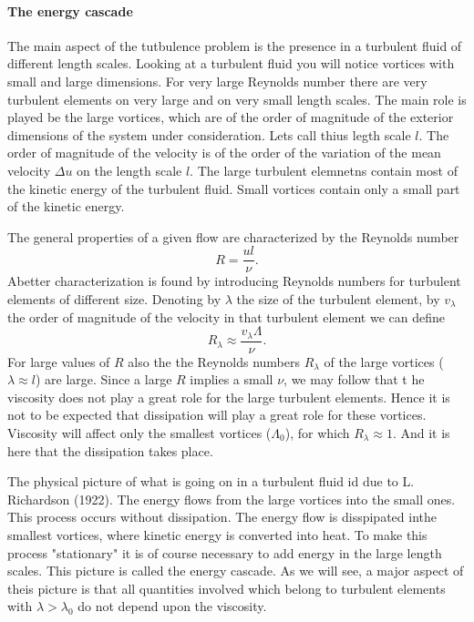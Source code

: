 \paragraph{The energy cascade}
The main aspect of the tutbulence problem is the presence in a turbulent fluid
of different length scales. Looking at a turbulent fluid you will notice
vortices with small and large dimensions. For very large Reynolds number there
are very turbulent elements on very large and on very small length scales. The
main role is played be the large vortices, which are of the order of magnitude
of the exterior dimensions of the system under consideration. Lets call thius
legth scale $l$. The order of magnitude of the velocity is of the order of the
variation of the mean velocity $\Delta u$  on the length scale $l$. The large
turbulent elemnetns contain most of the kinetic energy of the turbulent
fluid. Small vortices contain only a small part of the kinetic energy.

The general properties of a given flow are characterized by the Reynolds
number
\begin{displaymath}
  R = \frac{ul}{\nu}.
\end{displaymath}
Abetter characterization is found by introducing Reynolds numbers  for
turbulent elements of different size. Denoting by $\lambda$ the size of the
turbulent element, by $v_{\lambda}$ the order of magnitude of the velocity in
that turbulent element we can define
\begin{displaymath}
  R_{\lambda} \approx \frac{v_{\lambda} \Lambda}{\nu}.
\end{displaymath}
For large values of $R$ also the  the Reynolds numbers $R_{\lambda}$ of the
large vortices ($\lambda \approx l$) are large. Since a large $R$ implies a
small $\nu$, we may follow that t he viscosity does not play a great role  for
the large turbulent elements. Hence it is not to be expected that dissipation
will play a great role for these vortices. Viscosity will affect only the
smallest vortices ($\Lambda_0$), for which $R_{\lambda} \approx 1$. And it is
here that the dissipation takes place. 

The physical picture of what is going on in a turbulent fluid  id due to
L. Richardson (1922). The energy flows from the large vortices into the small
ones. This process occurs without dissipation. The energy flow is disspipated
inthe smallest vortices, where kinetic energy is converted into heat. To make
this process "stationary" it is of course necessary to add energy in the large
length scales. This picture is  called the energy cascade. As we will see, a
major aspect of theis picture is that all quantities involved which belong to
turbulent elements with $\lambda > \lambda_0$ do not depend upon the
viscosity.

